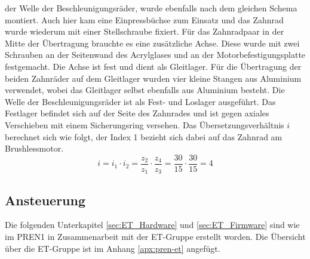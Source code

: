         der Welle der Beschleunigungsräder, wurde ebenfalls nach dem gleichen Schema 
        montiert. Auch hier kam eine Einpressbüchse zum Einsatz und das Zahnrad wurde wiederum mit 
        einer Stellschraube fixiert. Für das Zahnradpaar in der Mitte der Übertragung brauchte es eine 
        zusätzliche Achse. Diese wurde mit zwei Schrauben an der Seitenwand des 
        Acrylglases und an der Motorbefestigungsplatte festgemacht. Die Achse ist fest und dient als 
        Gleitlager. Für die Übertragung der beiden Zahnräder auf dem Gleitlager wurden vier kleine Stangen 
        aus Aluminium verwendet, wobei das Gleitlager selbst ebenfalls aus Aluminium besteht. Die Welle der 
        Beschleunigungsräder ist als Fest- und Loslager ausgeführt. Das Festlager befindet sich auf 
        der Seite des Zahnrades und ist gegen axiales Verschieben mit einem Sicherungsring versehen. 
        Das Übersetzungsverhältnis $i$ berechnet sich wie folgt, der Index 1 bezieht sich dabei auf 
        das Zahnrad am Brushlessmotor.
        \begin{equation}
            i = i_1 \cdot i_2 = \frac{z_2}{z_1} \cdot \frac{z_4}{z_3} = \frac{30}{15} \cdot \frac{30}{15} = 4
        \end{equation}
%
\subsection{Ansteuerung}
Die folgenden Unterkapitel \ref{sec:ET_Hardware} und \ref{sec:ET_Firmware} sind wie im PREN1 
\cite{Team32:Doku} in Zusammenarbeit mit der ET-Gruppe erstellt worden. Die Übersicht über die 
ET-Gruppe ist im Anhang \ref{apx:pren-et} angefügt.





